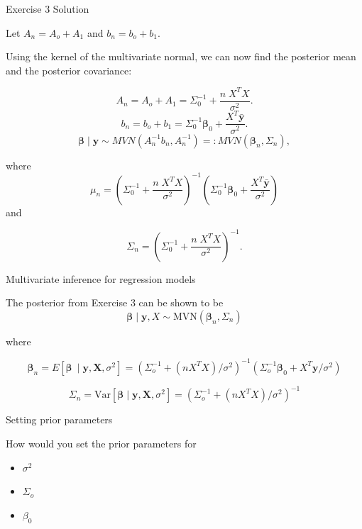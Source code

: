 \documentclass[
  ignorenonframetext,
]{beamer}
\providecommand{\tightlist}{%
  \setlength{\itemsep}{0pt}\setlength{\parskip}{0pt}}
\newcommand{\bbeta}{\bm{\beta}}
\newcommand{\bX}   {\bm{X}}
\begin{document}
\begin{frame}{Exercise 3 Solution}
\protect\hypertarget{exercise-3-solution-3}{}

Let \(A_n = A_o + A_1\) and \(b_n = b_o + b_1.\)

Using the kernel of the multivariate normal, we can now find the
posterior mean and the posterior covariance:

\[A_n = A_o + A_1 = \Sigma_0^{-1} + \frac{n\;X^TX}{\sigma^2}.\]
\[b_n = b_o + b_1 = \Sigma_0^{-1}\bbeta_0 + \frac{X^T\bar{\bm{y}}}{\sigma^2}.\]
\[\bbeta \mid \bm{y} \sim MVN(A_n^{-1} b_n, A_n^{-1}) =: MVN(\bbeta_n, \Sigma_n),\]

where
\[\mu_n = (\Sigma_0^{-1} + \frac{n\;X^TX}{\sigma^2})^{-1}(\Sigma_0^{-1}\bbeta_0 + \frac{X^T\bar{\bm{y}}}{\sigma^2})\]
and

\[\Sigma_n = (\Sigma_0^{-1} + \frac{n\;X^TX}{\sigma^2})^{-1}.\]

\end{frame}

\begin{frame}{Multivariate inference for regression models}
\protect\hypertarget{multivariate-inference-for-regression-models}{}

The posterior from Exercise 3 can be shown to be
\[\bbeta \mid \bm{y}, X \sim \text{MVN}(\bbeta_n, \Sigma_n)\]

where

\[\bbeta_n = E[\bbeta\ \mid \bm{y}, \bX, \sigma^2] = (\Sigma_o^{-1} + (nX^TX)/\sigma^2)^{-1}
(\Sigma_o^{-1}\bbeta_0 + X^T\bm{y}/\sigma^2)\]

\[\Sigma_n = \text{Var}[\bbeta \mid \bm{y}, \bX, \sigma^2] = (\Sigma_o^{-1} + (nX^TX)/\sigma^2)^{-1}\]

\end{frame}

\begin{frame}{Setting prior parameters}
\protect\hypertarget{setting-prior-parameters}{}

How would you set the prior parameters for

\begin{itemize}
\tightlist
\item
  \(\sigma^2\)
\item
  \(\Sigma_{o}\)
\item
  \(\beta_0\)
\end{itemize}

\end{frame}
\end{document}

